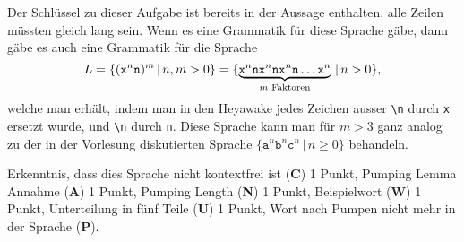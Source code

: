 \begin{diskussion}
Der Schlüssel zu dieser Aufgabe ist bereits in der Aussage enthalten,
alle Zeilen müssten gleich lang sein.
Wenn es eine Grammatik für diese Sprache gäbe, dann gäbe es auch
eine Grammatik für die Sprache
\[
L=\{ (\texttt{x}^n\texttt{\\n})^m\,|\, n,m>0\}
=
\{
\underbrace{
\texttt{x}^n\texttt{\\n}
\texttt{x}^n\texttt{\\n}
\texttt{x}^n\texttt{\\n}
\dots
\texttt{x}^n}_{\text{$m$ Faktoren}}
\,|\,n>0
\},
\]
welche man erhält, indem man in den Heyawake jedes Zeichen ausser 
\texttt{\textbackslash n} durch \texttt{x}
ersetzt wurde, und \texttt{\textbackslash n} durch \texttt{n}.
Diese Sprache kann man für $m>3$ ganz analog zu der in der Vorlesung
diskutierten Sprache $\{
\texttt{a}^n
\texttt{b}^n
\texttt{c}^n\,|\,n\ge 0\}$
behandeln.
\end{diskussion}

\begin{bewertung}
Erkenntnis, dass dies Sprache nicht kontextfrei ist ({\bf C}) 1 Punkt,
Pumping Lemma Annahme ({\bf A}) 1 Punkt,
Pumping Length ({\bf N}) 1 Punkt,
Beispielwort ({\bf W}) 1 Punkt,
Unterteilung in fünf Teile ({\bf U}) 1 Punkt,
Wort nach Pumpen nicht mehr in der Sprache ({\bf P}).
\end{bewertung}

